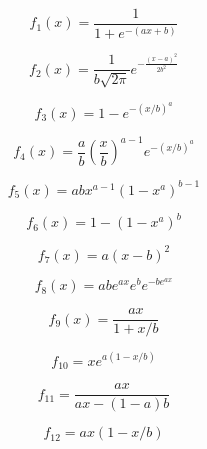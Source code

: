 \documentclass[14pt]{amsart}
\title{}
\author{}
\begin{document}

\clearpage
\vspace{-2in}
$$
f_1(x) = \frac{1}{1+e^{-(ax+b)}}
$$
\clearpage

\vspace{-2in}
$$
f_2(x) = \frac{1}{b \sqrt{2\pi}}e^{-\frac{(x-a)^2}{2b^2}}
$$
\clearpage

\vspace{-2in}
$$
f_3(x) = 1-e^{-(x/b)^a}
$$
\clearpage

\vspace{-2in}
$$
f_4(x) = \frac{a}{b}\left(\frac{x}{b}\right)^{a-1} e^{-(x/b)^a}
$$
\clearpage

\vspace{-2in}
$$
f_5(x) =abx^{a-1}(1-x^a)^{b-1}
$$
\clearpage

\vspace{-2in}
$$
f_6(x) =  1-(1-x^a)^b
$$
\clearpage

\vspace{-2in}
$$
f_7(x) = a(x-b)^2
$$

\clearpage

\vspace{-2in}
$$
f_8(x) = abe^{ax}e^{b}e^{-b e^{ax}}
$$
\clearpage

\vspace{-2in}
$$
f_9(x) = \frac{ax}{1+x/b}
$$
\clearpage

\vspace{-2in}
$$
f_{10} = x e^{a(1-x/b)}
$$
\clearpage

\vspace{-2in}
$$
f_{11}=\frac{ax}{ax-(1-a)b}
$$
\clearpage

\vspace{-2in}
$$
f_{12}=ax(1-x/b)
$$
\clearpage
\end{document}
